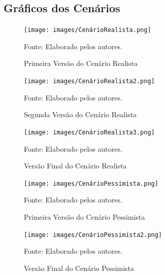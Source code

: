 \documentclass[
    12pt,               %
    openright,          %
    oneside,
    a4paper,            %
    BIBLATEX,           %
    TODO,               %
    english,            %
    brazil              %
    ]{ifsp-spo-inf-ctds}
\begin{document}
        \subsection{Gráficos dos Cenários}
        
            \begin{figure}[H]
                \centering
                 \caption{Primeira Versão do Cenário Realista}
                \texttt{[image: images/CenárioRealista.png]}
               
                \label{fig:cenariorealistaGrafico1}
                \centering
            \footnotesize Fonte: Elaborado pelos autores.
            \end{figure}
            
            \begin{figure}[H]
                \centering
                \caption{Segunda Versão do Cenário Realista}
                \texttt{[image: images/CenárioRealista2.png]}
                
                \label{fig:cenariorealistaGrafico2}
                \centering
            \footnotesize Fonte: Elaborado pelos autores.
            \end{figure}
            
            \begin{figure}[H]
                \centering
                \caption{Versão Final do Cenário Realista}
                \texttt{[image: images/CenárioRealista3.png]}
                
                \label{fig:cenariorealistaGrafico3}
                \centering
            \footnotesize Fonte: Elaborado pelos autores.
            \end{figure}
            
            
            \begin{figure}[H]
                \centering
                \caption{Primeira Versão do Cenário Pessimista}
                \texttt{[image: images/CenárioPessimista.png]}
                
                \label{fig:cenarioPessimistaGrafico}
                \centering
            \footnotesize Fonte: Elaborado pelos autores.
            \end{figure}
            
            \begin{figure}[H]
                \centering
                \caption{Versão Final do Cenário Pessimista}
                \texttt{[image: images/CenárioPessimista2.png]}
                
                \label{fig:cenarioPessimistaGrafico1}
                \centering
            \footnotesize Fonte: Elaborado pelos autores.
            \end{figure}
            
\end{document}
